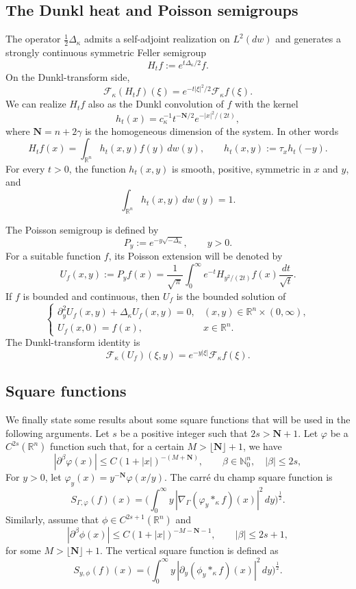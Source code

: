 \documentclass[11pt]{amsart}
\theoremstyle{definition}
\theoremstyle{remark}
\numberwithin{equation}{section}
\newcommand{\R}{\mathbb{R}}
\newcommand{\N}{\mathbb{N}}
\begin{document}
\subsection{The Dunkl heat and Poisson semigroups}

The operator $\frac12\Delta_\kappa$ admits a self-adjoint realization on $L^2(dw)$ and generates a strongly continuous symmetric Feller semigroup
\[
H_tf
:=
e^{t\Delta_\kappa/2}f.
\]
On the Dunkl-transform side,
\[
\mathcal F_\kappa(H_tf)(\xi)
=
e^{-t|\xi|^2/2}\mathcal F_\kappa f(\xi).
\]
We can realize $H_tf$ also as the Dunkl convolution of $f$ with the kernel
\[
h_t(x)=c_\kappa^{-1}t^{-\mathbf N/2}e^{-|x|^2/(2t)},
\]
where $\mathbf N=n+2\gamma$ is the homogeneous dimension of the system. In other words
\[
H_tf(x)
=
\int_{\R^n}
h_t(x,y)f(y)\,dw(y),
\qquad
h_t(x,y):=\tau_xh_t(-y).
\]
For every $t>0$, the function $h_t(x,y)$ is smooth, positive,
symmetric in $x$ and $y$, and
\begin{equation}\label{E: dunkl heat conservative}
\int_{\R^n}h_t(x,y)\,dw(y)=1.
\end{equation}

The Poisson semigroup is defined by
\[
P_y
:=
e^{-y\sqrt{-\Delta_\kappa}},
\qquad y>0.
\]
For a suitable function $f$, its Poisson extension will be denoted by
\begin{equation}
U_f(x,y)
:=
P_yf(x)
=
\frac1{\sqrt\pi}
\int_0^\infty
e^{-t}
H_{y^2/(2t)}f(x)
\frac{dt}{\sqrt t}.
\label{eq:dunkl-poisson-subordination}
\end{equation}
If $f$ is bounded and continuous, then $U_f$ is the bounded solution of
\[
\begin{cases}
\partial_y^2U_f(x,y)+\Delta_\kappa U_f(x,y)=0,
& (x,y)\in\R^n\times(0,\infty),\\
U_f(x,0)=f(x),
& x\in\R^n.
\end{cases}
\]
The Dunkl-transform identity is
\begin{equation*}
\mathcal F_\kappa(U_f)(\xi,y)
=
e^{-y|\xi|}\mathcal F_\kappa f(\xi).
\end{equation*}

\subsection{Square functions}
We finally state some results about some square functions that will be used in the following arguments. Let $s$ be a positive integer such that $2s>\mathbf N+1$. Let $\varphi$ be a $C^{2s}(\R^n)$ function such that, for a certain $M>\lfloor\mathbf N\rfloor+1$, we have
\[
|\partial^\beta\varphi(x)|\leq C(1+|x|)^{-(M+\mathbf N)},
\qquad \beta\in\N_0^n,\quad |\beta|\leq2s,
\]
For $y>0$, let $\varphi_y(x)=y^{-\mathbf N}\varphi(x/y)$.
The carr\'e du champ square function is
\[
S_{\Gamma,\varphi}(f)(x)
=\bigg(\int_0^\infty y\,|\nabla_\Gamma(\varphi_y\ast_\kappa f)(x)|^2\,dy\bigg)^{\frac12}.
\]
Similarly, assume that
$\phi\in C^{2s+1}(\R^n)$ and
\[
|\partial^\beta\phi(x)|
\leq
C(1+|x|)^{-M-\mathbf N-1},
\qquad
|\beta|\leq2s+1,
\]
for some $M>\lfloor\mathbf N\rfloor+1$. The vertical square function is defined as
\[
S_{y,\phi}(f)(x)
=\bigg(\int_0^\infty y\,|\partial_y(\phi_y\ast_\kappa f)(x)|^2\,dy\bigg)^{\frac12}.
\]
\end{document}
